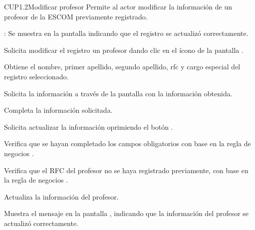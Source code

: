 \begin{UseCase}{CUP1.2}{Modificar profesor}{	
	Permite al actor modificar la información de un profesor de la ESCOM previamente registrado.
}
{\begin{UClist}
			\UCli {}: Se muestra en la pantalla  indicando que el registro se actualizó correctamente.
		\end{UClist}
	}
\end{UseCase}

\begin{UCtrayectoria}
	\UCpaso [\UCactor] Solicita modificar el registro un profesor dando clic en el ícono %
	de la pantalla . 
	
	\UCpaso [\UCsist] Obtiene el nombre, primer apellido, segundo apellido, rfc y cargo especial del registro seleccionado.
	
	\UCpaso [\UCsist] Solicita la información a través de la pantalla  con la información obtenida.
	
	\UCpaso [\UCactor] Completa la información solicitada. \label{CUP1.2:CompletaInfo}
	
	\UCpaso [\UCactor] Solicita actualizar la información oprimiendo el botón . 
	
	\UCpaso [\UCsist] Verifica que se hayan completado los campos obligatorios con base en la regla de negocios . 
	
	\UCpaso [\UCsist] Verifica que el RFC del profesor no se haya registrado previamente, con base en la regla de negocios . 
	
	\UCpaso [\UCsist] Actualiza la información del profesor.
	
	\UCpaso [\UCsist] Muestra el mensaje  en la pantalla , indicando que la información del profesor se actualizó correctamente.	
\end{UCtrayectoria}


